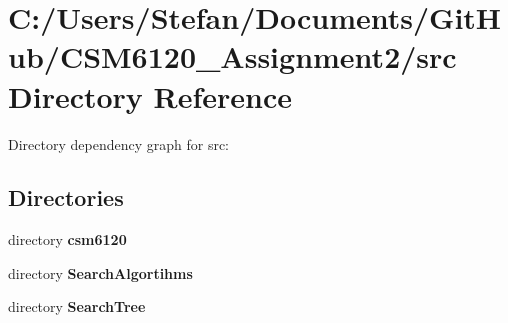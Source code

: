 \section{C\+:/\+Users/\+Stefan/\+Documents/\+Git\+Hub/\+C\+S\+M6120\+\_\+\+Assignment2/src Directory Reference}
\label{dir_346b9472caafb6cb6cf9ad47448919a9}
Directory dependency graph for src\+:
\subsection*{Directories}
\begin{DoxyCompactItemize}
\item 
directory {\bf csm6120}
\item 
directory {\bf Search\+Algortihms}
\item 
directory {\bf Search\+Tree}
\end{DoxyCompactItemize}
